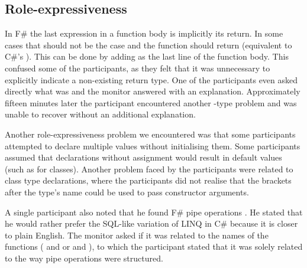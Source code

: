 \subsection{Role-expressiveness}
In F\# the last expression in a function body is implicitly its return. In some cases that should not be the case and the function should return  (equivalent to C\#'s ). This can be done by adding \ttt{()} as the last line of the function body. This confused some of the participants, as they felt that it was unnecessary to explicitly indicate a non-existing return type. One of the participants even asked directly what  was and the monitor answered with an explanation. Approximately fifteen minutes later the participant encountered another -type problem and was unable to recover without an additional explanation.

Another role-expressiveness problem we encountered was that some participants attempted to  declare multiple values without initialising them. Some participants assumed that  declarations without assignment would result in default values (such as  for classes). Another problem faced by the participants were related to class type declarations, where the participants did not realise that the brackets after the type's name could be used to pass constructor arguments.

A single participant also noted that he found F\# pipe operations . He stated that he would rather prefer the SQL-like variation of \gls{LINQ} in C\# because it is closer to plain English. The monitor asked if it was related to the names of the functions ( and  or  and ), to which the participant stated that it was solely related to the way pipe operations were structured.
